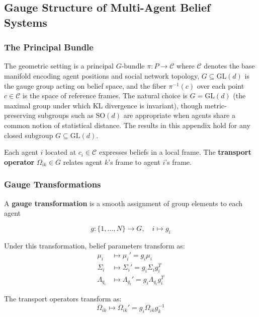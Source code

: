 \documentclass[12pt]{article}
\begin{document}
\subsection{Gauge Structure of Multi-Agent Belief Systems}

\subsubsection{The Principal Bundle}

The geometric setting is a principal $G$-bundle $\pi: P \to \mathcal{C}$ where $\mathcal{C}$ denotes the base manifold encoding agent positions and social network topology, $G \subseteq \mathrm{GL}(d)$ is the gauge group acting on belief space, and the fiber $\pi^{-1}(c)$ over each point $c \in \mathcal{C}$ is the space of reference frames. The natural choice is $G = \mathrm{GL}(d)$ (the maximal group under which KL divergence is invariant), though metric-preserving subgroups such as $\mathrm{SO}(d)$ are appropriate when agents share a common notion of statistical distance. The results in this appendix hold for any closed subgroup $G \subseteq \mathrm{GL}(d)$.

Each agent $i$ located at $c_i \in \mathcal{C}$ expresses beliefs in a local frame. The \textbf{transport operator} $\Omega_{ik} \in G$ relates agent $k$'s frame to agent $i$'s frame.

\subsubsection{Gauge Transformations}

A \textbf{gauge transformation} is a smooth assignment of group elements to each agent

\begin{equation}
g: \{1, \ldots, N\} \to G, \quad i \mapsto g_i
\end{equation}

Under this transformation, belief parameters transform as:
\begin{align}
\mu_i &\mapsto \mu_i' = g_i \mu_i \\
\Sigma_i &\mapsto \Sigma_i' = g_i \Sigma_i g_i^T \\
\Lambda_{q_i} &\mapsto \Lambda_{q_i}' = g_i \Lambda_{q_i} g_i^T
\end{align}

The transport operators transform as:
\begin{equation}
\Omega_{ik} \mapsto \Omega_{ik}' = g_i \Omega_{ik} g_k^{-1}
\end{equation}
\end{document}
